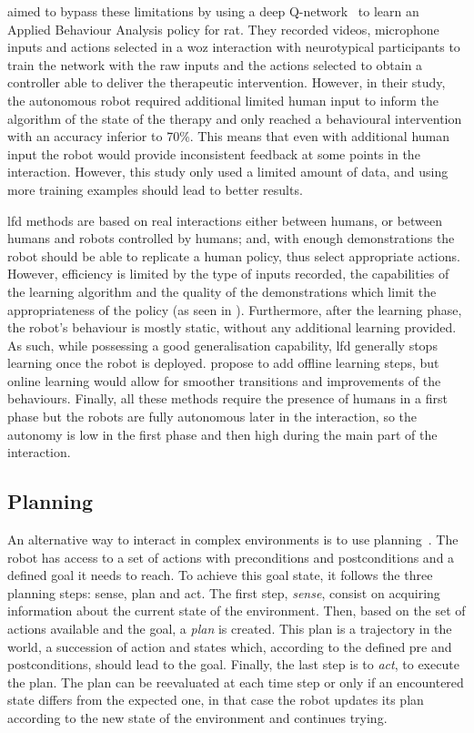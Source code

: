 \cite{clark2018deep} aimed to bypass these limitations by using a deep Q-network~\citep{mnih2015human} to learn an Applied Behaviour Analysis policy for \gls{rat}. They recorded videos, microphone inputs and actions selected in a \gls{woz} interaction with neurotypical participants to train the network with the raw inputs and the actions selected to obtain a controller able to deliver the therapeutic intervention. However, in their study, the autonomous robot required additional limited human input to inform the algorithm of the state of the therapy and only reached a behavioural intervention with an accuracy inferior to 70\%. This means that even with additional human input the robot would provide inconsistent feedback at some points in the interaction. However, this study only used a limited amount of data, and using more training examples should lead to better results.
 
\gls{lfd} methods are based on real interactions either between humans, or between humans and robots controlled by humans; and, with enough demonstrations the robot should be able to replicate a human policy, thus select appropriate actions. However, efficiency is limited by the type of inputs recorded, the capabilities of the learning algorithm and the quality of the demonstrations which limit the appropriateness of the policy (as seen in \citealt{clark2018deep}). Furthermore, after the learning phase, the robot's behaviour is  mostly static, without any additional learning provided. As such, while possessing a good generalisation capability, \gls{lfd} generally stops learning once the robot is deployed. \cite{sequeira2016discovering} propose to add offline learning steps, but online learning would allow for smoother transitions and improvements of the behaviours.
Finally, all these methods require the presence of humans in a first phase but the robots are fully autonomous later in the interaction, so the autonomy is low in the first phase and then high during the main part of the interaction.

\subsection{Planning} \label{ssec:planning}

An alternative way to interact in complex environments is to use planning~\citep{asada1986robot}. The robot has access to a set of actions with preconditions and postconditions and a defined goal it needs to reach. To achieve this goal state, it follows the three planning steps: sense, plan and act. The first step, \emph{sense}, consist on acquiring information about the current state of the environment. Then, based on the set of actions available and the goal, a \emph{plan} is created. This plan is a trajectory in the world, a succession of action and states which, according to the defined pre and postconditions, should lead to the goal. Finally, the last step is to \emph{act}, to execute the plan. The plan can be reevaluated at each time step or only if an encountered state differs from the expected one, in that case the robot updates its plan according to the new state of the environment and continues trying.

